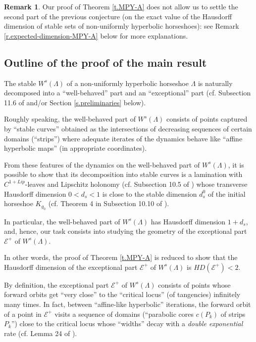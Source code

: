 \documentclass[12pt]{amsart}
\numberwithin{equation}{section}
\theoremstyle{definition}
\newtheorem{remark}[theorem]{Remark}
\newcommand{\<}{{\langle}}
\renewcommand{\>}{{\rangle}}
\begin{document}
\begin{remark} Our proof of Theorem \ref{t.MPY-A} does not allow us to settle the second part of the previous conjecture (on the exact value of the Hausdorff dimension of stable sets of non-uniformly hyperbolic horseshoes): see Remark %
\ref{r.expected-dimension-MPY-A} below for more explanations. 
\end{remark}

\subsection{Outline of the proof of the main result} The stable $W^s(\Lambda)$ of a non-uniformly hyperbolic horseshoe $\Lambda$ is naturally decomposed into a ``well-behaved'' part and an ``exceptional'' part (cf. Subsection 11.6 of \cite{PY09} and/or Section \ref{s.preliminaries} below). 

Roughly speaking, the well-behaved part of $W^s(\Lambda)$ consists of points captured by ``stable curves'' obtained as the intersections of decreasing sequences of certain domains (``strips'') where adequate iterates of the dynamics behave like ``affine hyperbolic maps'' (in appropriate coordinates). 

From these features of the dynamics on the well-behaved part of $W^s(\Lambda)$, it is possible to show that its decomposition into stable curves is a lamination with $C^{1+Lip}$-leaves and Lipschitz holonomy (cf. Subsection 10.5 of \cite{PY09}) whose transverse Hausdorff dimension $0<d_s<1$ is close to the stable dimension $d_s^0$ of the initial horseshoe $K_{g_0}$ (cf. Theorem 4 in Subsection 10.10 of \cite{PY09}). 

In particular, the well-behaved part of $W^s(\Lambda)$ has Hausdorff dimension $1+d_s$, and, hence, our task consists into studying the geometry of the exceptional part $\mathcal{E}^+$ of $W^s(\Lambda)$. 

In other words, the proof of Theorem \ref{t.MPY-A} is reduced to show that the Hausdorff dimension of the exceptional part $\mathcal{E}^+$ of $W^s(\Lambda)$ is $HD(\mathcal{E}^+)<2$.  

By definition, the exceptional part $\mathcal{E}^+$ of $W^s(\Lambda)$ consists of points whose forward orbits get ``very close'' to the ``critical locus'' (of tangencies) infinitely many times. In fact, between ``affine-like hyperbolic'' iterations, the forward orbit of a point in $\mathcal{E}^+$ visits a sequence of domains (``parabolic cores $c(P_k)$ of strips $P_k$'') close to the critical locus whose ``widths'' decay with a \emph{double exponential} rate (cf. Lemma 24 of \cite{PY09}). 
\end{document}
